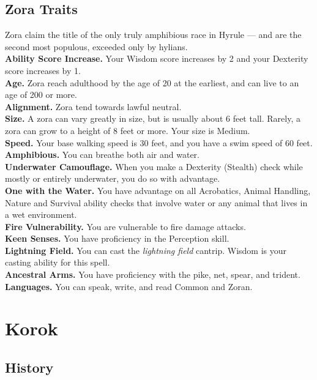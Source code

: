 \documentclass[10pt,twoside,twocolumn,openany]{book}
\begin{document}
\subsection{Zora Traits}
Zora claim the title of the only truly amphibious race in Hyrule — and are the second most populous, exceeded only by hylians.\\
\indent \textbf{Ability Score Increase.} Your Wisdom score increases by 2 and your Dexterity score increases by 1.\\
\indent \textbf{Age.} Zora reach adulthood by the age of 20 at the earliest, and can live to an age of 200 or more.\\
\indent \textbf{Alignment.} Zora tend towards lawful neutral.\\
\indent \textbf{Size.} A zora can vary greatly in size, but is usually about 6 feet tall. Rarely, a zora can grow to a height of 8 feet or more. Your size is Medium.\\
\indent \textbf{Speed.} Your base walking speed is 30 feet, and you have a swim speed of 60 feet.\\
\indent \textbf{Amphibious.} You can breathe both air and water.\\
\indent \textbf{Underwater Camouflage.} When you make a Dexterity (Stealth) check while mostly or entirely underwater, you do so with advantage. \\
\indent \textbf{One with the Water.} You have advantage on all Acrobatics, Animal Handling, Nature and Survival ability checks that involve water or any animal that lives in a wet environment.\\
\indent \textbf{Fire Vulnerability.} You are vulnerable to fire damage attacks.\\
\indent \textbf{Keen Senses.} You have proficiency in the Perception skill.\\
\indent \textbf{Lightning Field.} You can cast the \textit{lightning field} cantrip. Wisdom is your casting ability for this spell. \\
\indent \textbf{Ancestral Arms.} You have proficiency with the pike, net, spear, and trident.\\
\indent \textbf{Languages.} You can speak, write, and read Common and Zoran.
\newpage

\section{Korok}

\subsection{History}
\end{document}

